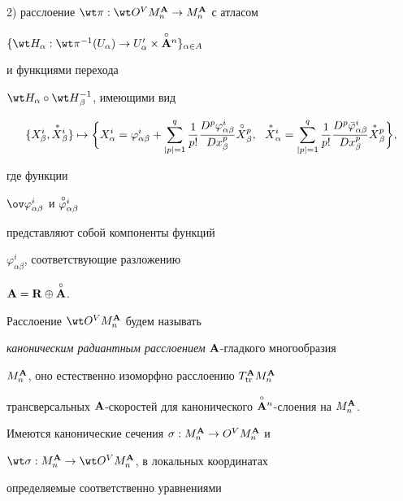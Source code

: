 2) расслоение  $\wt\pi:\wt O^VM^\A_n\to M^\A_n$ с атласом


$\{\wt H_\alpha : \wt\pi{}^{-1}(U_\alpha)


\to U'_\alpha\times\Aon\}_{\alpha\in A}$


и функциями перехода


$\wt H_{\alpha}\circ\wt H{}^{-1}_{\beta}$, имеющими вид


\begin{equation}


\label{o.3}


\{X_{\beta}^i,{\puts X}{}_{\beta}^i\} \mapsto


\bigg\{X_{\alpha}^i=\varphi^i_{\alpha\beta}+


\sum^q_{|p|=1}\frac{1}{p!}


\frac{D^p\varphi^i_{\alpha\beta}}{Dx^p_\beta}


\puto X{}^p_\beta,


\ \ {\puts X}{}_\alpha^i=


\sum^q_{|p|=1}\frac{1}{p!}


\frac{D^p\bar\varphi^i_{\alpha\beta}}{Dx^p_\beta}


{\puts X}{}^p_\beta\bigg\},


\end{equation}


где функции


$\ov\varphi^i_{\alpha\beta}$ и ${\overset{\,\circ}{\varphi}{}}{}^i_{\alpha\beta}$


представляют собой компоненты функций


$\varphi^i_{\alpha\beta}$, соответствующие разложению


${\bold A}={{\bold R}}\oplus{\overset{\circ}{\bold A}{}}$.





Расслоение $\wt O^VM^\A_n$ будем называть


{\it каноническим радиантным расслоением} ${\bold A}$-гладкого многообразия


$M^{\bold A}_n$, оно естественно изоморфно расслоению $T^{\bold A}_{\operatorname{tr}}M^{\bold A}_n$


трансверсальных ${\bold A}$-скоростей для канонического $\overset{\circ}{\bold A}{}^n$-слоения на $M^{\bold A}_n$.





Имеются канонические сечения $\sigma: M^{\bold A}_n\to O^VM^{\bold A}_n$ и


$\wt\sigma: M^\A_n\to \wt O^VM^\A_n$, в локальных координатах


определяемые соответственно уравнениями


